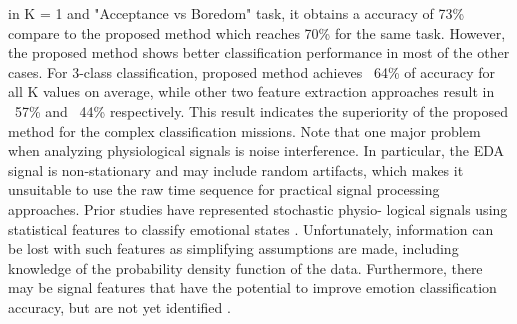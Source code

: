in K = 1 and "Acceptance vs Boredom" task, it obtains a accuracy of 73\% compare to the proposed method which reaches
70\% for the same task. However, the proposed method shows better classification performance in most of the other
cases. For 3-class classification, proposed method achieves ~64\% of accuracy for all K values on average, while other
two feature extraction approaches result in ~57\% and ~44\% respectively. This result indicates the superiority of the 
proposed method for the complex classification missions. Note that one major problem when analyzing physiological signals 
is noise interference. In particular, the EDA signal is non-stationary and may include random artifacts, which makes it 
unsuitable to use the raw time sequence for practical signal processing approaches. Prior studies have represented 
stochastic physio- logical signals using statistical features to classify emotional states \cite{mera2004emotion}. 
Unfortunately, information can be lost with such features as simplifying assumptions are made, including knowledge 
of the probability density function of the data. Furthermore, there may be signal features that have the potential 
to improve emotion classification accuracy, but are not yet identified \cite{swangnetr2012emotional}.\\

